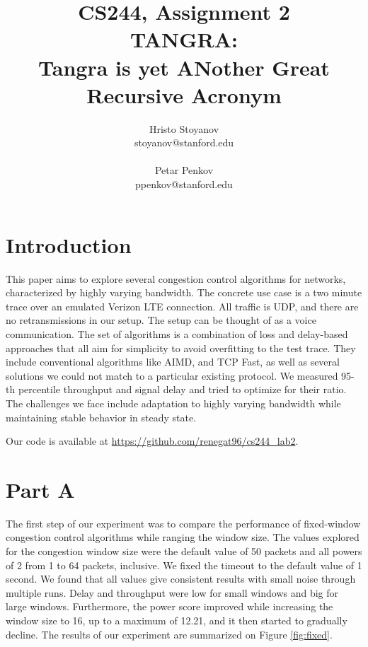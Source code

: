 \documentclass[12pt]{article}
\begin{document}
 
\title{CS244, Assignment 2\\TANGRA:\\ Tangra is yet ANother Great Recursive
Acronym}
\author{Hristo Stoyanov\\
stoyanov@stanford.edu\\
\\
Petar Penkov\\
ppenkov@stanford.edu}
 
\maketitle

\pagebreak

\section*{Introduction}

This paper aims to explore several congestion control algorithms for networks,
characterized by highly varying bandwidth. The concrete use case is a two minute
trace over an emulated Verizon LTE connection. All traffic is UDP, and there are
no retransmissions in our setup. The setup can be thought of as a voice
communication. The set of algorithms is a combination of loss and delay-based
approaches that all aim for simplicity to avoid overfitting to the test trace.
They include conventional algorithms like AIMD, and TCP Fast, as well as several
solutions we could not match to a particular existing protocol. We measured
95-th percentile throughput and signal delay and tried to optimize for their
ratio. The challenges we face include adaptation to highly varying bandwidth while
maintaining stable behavior in steady state.

Our code is available at \url{https://github.com/renegat96/cs244_lab2}.

\section*{Part A}

The first step of our experiment was to compare the performance of fixed-window
congestion control algorithms while ranging the window size. The values explored
for the congestion window size were the default value of 50 packets and all
powers of 2 from 1 to 64 packets, inclusive. We fixed the timeout to the default
value of 1 second. We found that all values give consistent results with small
noise through multiple runs. Delay and throughput were low for small windows and
big for large windows. Furthermore, the power score improved while increasing
the window size to 16, up to a maximum of 12.21, and it then started to
gradually decline. The results of our experiment are summarized on Figure
\ref{fig:fixed}.
\end{document}
